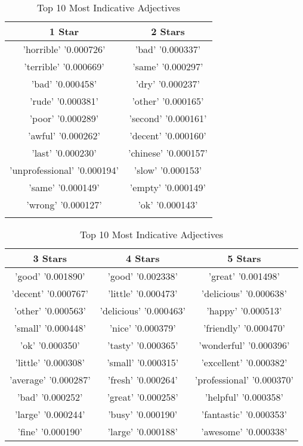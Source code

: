     \begin{center}
        \tiny
        \begin{table}[!h]
        \caption{Top 10 Most Indicative Adjectives}
            \begin{tabular}{c | c}
                1 Star & 2 Stars\\\hline
                'horrible' '0.000726' & 'bad' '0.000337'\\
                'terrible' '0.000669' & 'same' '0.000297'\\
                'bad' '0.000458' & 'dry' '0.000237'\\
                'rude' '0.000381' & 'other' '0.000165'\\
                'poor' '0.000289' & 'second' '0.000161'\\
                'awful' '0.000262' & 'decent' '0.000160'\\
                'last' '0.000230' & 'chinese' '0.000157'\\
                'unprofessional' '0.000194' & 'slow' '0.000153'\\
                'same' '0.000149' & 'empty' '0.000149'\\
                'wrong' '0.000127' & 'ok' '0.000143'\\
                \\
            \end{tabular}
            
            \begin{tabular}{c | c | c}
                3 Stars & 4 Stars & 5 Stars\\\hline
                'good' '0.001890' & 'good' '0.002338' & 'great' '0.001498'\\
                'decent' '0.000767' & 'little' '0.000473' & 'delicious' '0.000638'\\
                'other' '0.000563' & 'delicious' '0.000463' & 'happy' '0.000513'\\
                'small' '0.000448' & 'nice' '0.000379' & 'friendly' '0.000470'\\
                'ok' '0.000350' & 'tasty' '0.000365' & 'wonderful' '0.000396'\\
                'little' '0.000308' & 'small' '0.000315' & 'excellent' '0.000382'\\
                'average' '0.000287' & 'fresh' '0.000264' & 'professional' '0.000370'\\
                'bad' '0.000252' & 'great' '0.000258' & 'helpful' '0.000358'\\
                'large' '0.000244' & 'busy' '0.000190' & 'fantastic' '0.000353'\\
                'fine' '0.000190' & 'large' '0.000188' & 'awesome' '0.000338'\\
            \end{tabular}
        \end{table}
    \end{center}

